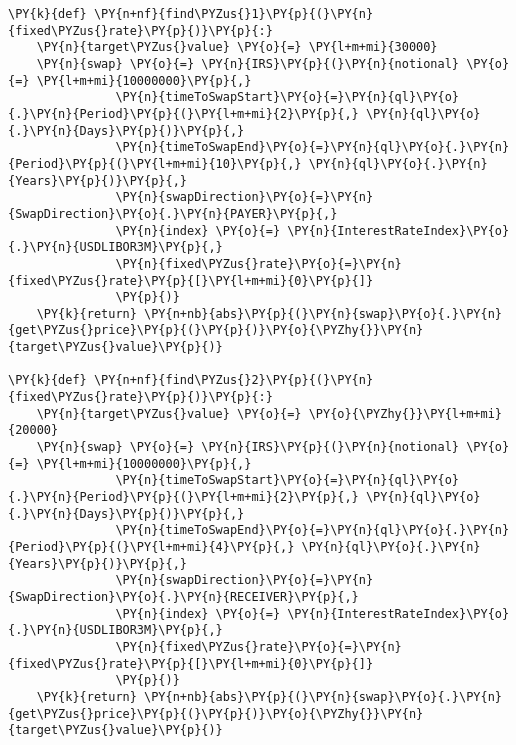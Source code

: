     \begin{tcolorbox}[breakable, size=fbox, boxrule=1pt, pad at break*=1mm,colback=cellbackground, colframe=cellborder]
\begin{Verbatim}[commandchars=\\\{\}]
\PY{k}{def} \PY{n+nf}{find\PYZus{}1}\PY{p}{(}\PY{n}{fixed\PYZus{}rate}\PY{p}{)}\PY{p}{:}
    \PY{n}{target\PYZus{}value} \PY{o}{=} \PY{l+m+mi}{30000}
    \PY{n}{swap} \PY{o}{=} \PY{n}{IRS}\PY{p}{(}\PY{n}{notional} \PY{o}{=} \PY{l+m+mi}{10000000}\PY{p}{,}
               \PY{n}{timeToSwapStart}\PY{o}{=}\PY{n}{ql}\PY{o}{.}\PY{n}{Period}\PY{p}{(}\PY{l+m+mi}{2}\PY{p}{,} \PY{n}{ql}\PY{o}{.}\PY{n}{Days}\PY{p}{)}\PY{p}{,}
               \PY{n}{timeToSwapEnd}\PY{o}{=}\PY{n}{ql}\PY{o}{.}\PY{n}{Period}\PY{p}{(}\PY{l+m+mi}{10}\PY{p}{,} \PY{n}{ql}\PY{o}{.}\PY{n}{Years}\PY{p}{)}\PY{p}{,}
               \PY{n}{swapDirection}\PY{o}{=}\PY{n}{SwapDirection}\PY{o}{.}\PY{n}{PAYER}\PY{p}{,}
               \PY{n}{index} \PY{o}{=} \PY{n}{InterestRateIndex}\PY{o}{.}\PY{n}{USDLIBOR3M}\PY{p}{,}
               \PY{n}{fixed\PYZus{}rate}\PY{o}{=}\PY{n}{fixed\PYZus{}rate}\PY{p}{[}\PY{l+m+mi}{0}\PY{p}{]}
               \PY{p}{)}
    \PY{k}{return} \PY{n+nb}{abs}\PY{p}{(}\PY{n}{swap}\PY{o}{.}\PY{n}{get\PYZus{}price}\PY{p}{(}\PY{p}{)}\PY{o}{\PYZhy{}}\PY{n}{target\PYZus{}value}\PY{p}{)}

\PY{k}{def} \PY{n+nf}{find\PYZus{}2}\PY{p}{(}\PY{n}{fixed\PYZus{}rate}\PY{p}{)}\PY{p}{:}
    \PY{n}{target\PYZus{}value} \PY{o}{=} \PY{o}{\PYZhy{}}\PY{l+m+mi}{20000}
    \PY{n}{swap} \PY{o}{=} \PY{n}{IRS}\PY{p}{(}\PY{n}{notional} \PY{o}{=} \PY{l+m+mi}{10000000}\PY{p}{,}
               \PY{n}{timeToSwapStart}\PY{o}{=}\PY{n}{ql}\PY{o}{.}\PY{n}{Period}\PY{p}{(}\PY{l+m+mi}{2}\PY{p}{,} \PY{n}{ql}\PY{o}{.}\PY{n}{Days}\PY{p}{)}\PY{p}{,}
               \PY{n}{timeToSwapEnd}\PY{o}{=}\PY{n}{ql}\PY{o}{.}\PY{n}{Period}\PY{p}{(}\PY{l+m+mi}{4}\PY{p}{,} \PY{n}{ql}\PY{o}{.}\PY{n}{Years}\PY{p}{)}\PY{p}{,}
               \PY{n}{swapDirection}\PY{o}{=}\PY{n}{SwapDirection}\PY{o}{.}\PY{n}{RECEIVER}\PY{p}{,}
               \PY{n}{index} \PY{o}{=} \PY{n}{InterestRateIndex}\PY{o}{.}\PY{n}{USDLIBOR3M}\PY{p}{,}
               \PY{n}{fixed\PYZus{}rate}\PY{o}{=}\PY{n}{fixed\PYZus{}rate}\PY{p}{[}\PY{l+m+mi}{0}\PY{p}{]}
               \PY{p}{)}
    \PY{k}{return} \PY{n+nb}{abs}\PY{p}{(}\PY{n}{swap}\PY{o}{.}\PY{n}{get\PYZus{}price}\PY{p}{(}\PY{p}{)}\PY{o}{\PYZhy{}}\PY{n}{target\PYZus{}value}\PY{p}{)}


\end{Verbatim}
\end{tcolorbox}

